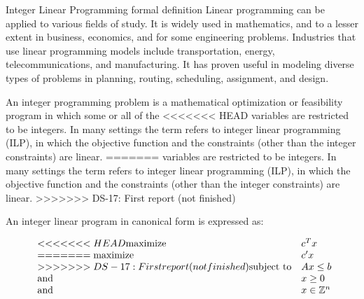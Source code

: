 \documentclass[9pt]{extarticle}
\begin{document}
\begin{section}{Integer Linear Programming formal definition}
        Linear programming can be applied to various fields of study. 
        It is widely used in mathematics, and to a lesser extent in business, economics, and for some engineering problems. 
        Industries that use linear programming models include transportation, energy, telecommunications, and manufacturing. 
        It has proven useful in modeling diverse types of problems in planning, routing, scheduling, assignment, and design.
        \cite{wiki:lp}

        An integer programming problem is a mathematical optimization or feasibility program in which some or all of the 
<<<<<<< HEAD
        variables are restricted to be integers. 
        In many settings the term refers to integer linear programming (ILP), in which the objective function and the 
        constraints (other than the integer constraints) are linear.
=======
        variables are restricted to be integers. In many settings the term refers to integer linear programming (ILP), 
        in which the objective function and the constraints (other than the integer constraints) are linear.
>>>>>>> DS-17: First report (not finished)

        An integer linear program in canonical form is expressed as:

        \begin{equation*}
            \begin{array}{ll@{}ll}
<<<<<<< HEAD
                \text{maximize}  & c^{T}x \\
=======
                \text{maximize}  & c'x \\
>>>>>>> DS-17: First report (not finished)
                \text{subject to}& Ax \leq b \\
                \text{and} & x \ge 0 \\
                \text{and} & x \in \mathbb{Z}^n \\
            \end{array}
        \end{equation*}

    \end{section}
\end{document}
